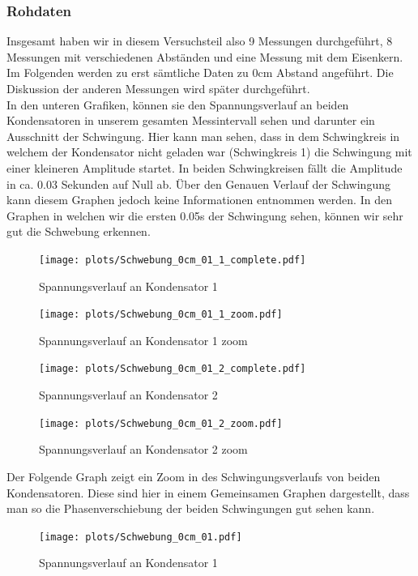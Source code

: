 \documentclass[twoside]{protokoll}
\begin{document}
\subsubsection{Rohdaten}

Insgesamt haben wir in diesem Versuchsteil also 9 Messungen durchgeführt, 8 Messungen mit verschiedenen Abständen und eine Messung mit dem Eisenkern. 
Im Folgenden werden zu erst sämtliche Daten zu 0cm Abstand angeführt. Die Diskussion der anderen Messungen wird später durchgeführt.\\


In den unteren Grafiken, können sie den Spannungsverlauf an beiden Kondensatoren in unserem gesamten Messintervall sehen und darunter ein Ausschnitt der Schwingung. 
Hier kann man sehen, dass in dem Schwingkreis in welchem der Kondensator nicht geladen war (Schwingkreis 1) die Schwingung mit einer kleineren Amplitude startet. 
In beiden Schwingkreisen fällt die Amplitude in ca. 0.03 Sekunden auf Null ab.
Über den Genauen Verlauf der Schwingung kann diesem Graphen jedoch keine Informationen entnommen werden. 
In den Graphen in welchen wir die ersten 0.05s der Schwingung sehen, können wir sehr gut die Schwebung erkennen. 

\begin{figure}[H]
    \centering
    \texttt{[image: plots/Schwebung\_0cm\_01\_1\_complete.pdf]}
    \caption{Spannungsverlauf an Kondensator 1}
\end{figure}
\begin{figure}[H]
    \centering
    \texttt{[image: plots/Schwebung\_0cm\_01\_1\_zoom.pdf]}
    \caption{Spannungsverlauf an Kondensator 1 zoom}
\end{figure}


\begin{figure}[H]
    \centering
    \texttt{[image: plots/Schwebung\_0cm\_01\_2\_complete.pdf]}
    \caption{Spannungsverlauf an Kondensator 2}
\end{figure}
\begin{figure}[H]
    \centering
    \texttt{[image: plots/Schwebung\_0cm\_01\_2\_zoom.pdf]}
    \caption{Spannungsverlauf an Kondensator 2 zoom}
\end{figure}


Der Folgende Graph zeigt ein Zoom in des Schwingungsverlaufs von beiden Kondensatoren. Diese sind hier in einem Gemeinsamen Graphen dargestellt, dass man so die Phasenverschiebung der beiden Schwingungen gut sehen kann. 

\begin{figure}[H]
    \centering
    \texttt{[image: plots/Schwebung\_0cm\_01.pdf]}
    \caption{Spannungsverlauf an Kondensator 1}
    \label{Schwebung}
\end{figure}
\end{document}

